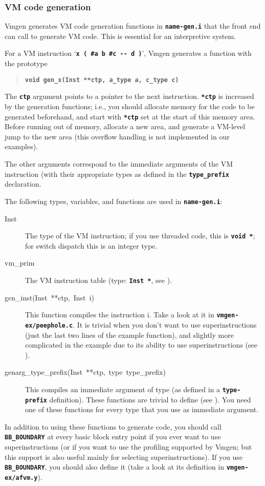 \documentclass[10pt,english]{article}
\begin{document}
\subsubsection{VM code generation\label{sub:VM-code-generation}}

Vmgen generates VM code generation functions in \texttt{\textbf{name-gen.i}}
that the front end can call to generate VM code. This is essential
for an interpretive system.

For a VM instruction \textquoteleft{}\texttt{\textbf{x ( \#a b \#c
-{}- d )}}\textquoteright{}, Vmgen generates a function with the prototype
\begin{quotation}
\texttt{\textbf{void gen\_x(Inst {*}{*}ctp, a\_type a, c\_type c)}}
\end{quotation}
The \texttt{\textbf{ctp}} argument points to a pointer to the next
instruction. \texttt{\textbf{{*}ctp}} is increased by the generation
functions; i.e., you should allocate memory for the code to be generated
beforehand, and start with \texttt{\textbf{{*}ctp}} set at the start
of this memory area. Before running out of memory, allocate a new
area, and generate a VM-level jump to the new area (this overflow
handling is not implemented in our examples).

The other arguments correspond to the immediate arguments of the VM
instruction (with their appropriate types as defined in the \texttt{\textbf{type\_prefix}}
declaration.

The following types, variables, and functions are used in \texttt{\textbf{name-gen.i}}:
\begin{description}
\item [{Inst}] The type of the VM instruction; if you use threaded code,
this is \texttt{\textbf{void {*}}}; for switch dispatch this is an
integer type.
\item [{vm\_prim}] The VM instruction table (type: \texttt{\textbf{Inst
{*}}}, see ).
\item [{gen\_inst(Inst~{*}{*}ctp,~Inst~i)}] This function compiles the
instruction i. Take a look at it in \texttt{\textbf{vmgen-ex/peephole.c}}.
It is trivial when you don't want to use superinstructions (just the
last two lines of the example function), and slightly more complicated
in the example due to its ability to use superinstructions (see ).
\item [{genarg\_type\_prefix(Inst~{*}{*}ctp,~type~type\_prefix)}] This
compiles an immediate argument of type (as defined in a \texttt{\textbf{type-prefix}}
definition). These functions are trivial to define (see \texttt{\textbf{}}).
You need one of these functions for every type that you use as immediate
argument.
\end{description}
In addition to using these functions to generate code, you should
call \texttt{\textbf{BB\_BOUNDARY}} at every basic block entry point
if you ever want to use superinstructions (or if you want to use the
profiling supported by Vmgen; but this support is also useful mainly
for selecting superinstructions). If you use \texttt{\textbf{BB\_BOUNDARY}},
you should also define it (take a look at its definition in \texttt{\textbf{vmgen-ex/afvm.y}}).
\end{document}
